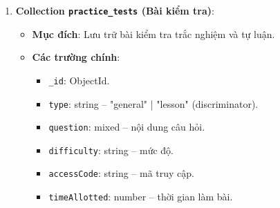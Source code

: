 \begin{enumerate}
\begin{itemize}
\begin{itemize}
            \item \texttt{chapterId}: string – mã chương học.
    
            \item \texttt{difficulty}: string – "basic" | "intermediate" | "advanced".
    
            \item \texttt{entries}: Entry[] – danh sách câu hỏi (embedded document).
    
            \item \texttt{variables}: Variable – cấu hình biến (embedded document).
    
            \item \texttt{contextTemplates}: ContextTemplate – danh sách context (embedded document).
    
            \item \texttt{createdAt}, \texttt{updatedAt}: Date – thời gian tạo và cập nhật.
        \end{itemize}
    \end{itemize}
    
    
    \item \textbf{Collection \texttt{practice\_tests} (Bài kiểm tra)}:
    \begin{itemize}
        \item \textbf{Mục đích}: Lưu trữ bài kiểm tra trắc nghiệm và tự luận.
    
        \item \textbf{Các trường chính}:
        \begin{itemize}
            \item \texttt{\_id}: ObjectId.
    
            \item \texttt{type}: string – "general" | "lesson" (discriminator).
    
            \item \texttt{question}: mixed – nội dung câu hỏi.
    
            \item \texttt{difficulty}: string – mức độ.
    
            \item \texttt{accessCode}: string – mã truy cập.
    
            \item \texttt{timeAllotted}: number – thời gian làm bài.
    

\end{itemize}
\end{itemize}
\end{enumerate}
